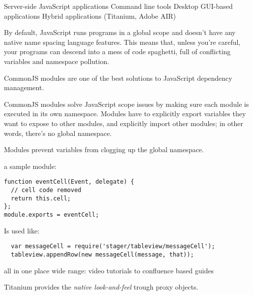 Server-side JavaScript applications
Command line tools
Desktop GUI-based applications
Hybrid applications (Titanium, Adobe AIR)



By default, JavaScript runs programs in a global scope and doesn't have any native name spacing language features. This means that, unless you're careful, your programs can descend into a mess of code spaghetti, full of conflicting variables and namespace pollution.

CommonJS modules are one of the best solutions to JavaScript dependency management.

CommonJS modules solve JavaScript scope issues by making sure each module is executed in its own namespace. Modules have to explicitly export variables they want to expose to other modules, and explicitly import other modules; in other words, there's no global namespace.

Modules prevent variables from clogging up the global namespace.


a sample module:


\begin{verbatim}
function eventCell(Event, delegate) {
  // cell code removed
  return this.cell;
};
module.exports = eventCell;
\end{verbatim}

Is used like:
\begin{verbatim}
  var messageCell = require('stager/tableview/messageCell');
  tableview.appendRow(new messageCell(message, that));
\end{verbatim}


%
%

all in one place
wide range: video tutorials to confluence based guides


Titanium provides the \emph{native look-and-feel} trough proxy objects. 

